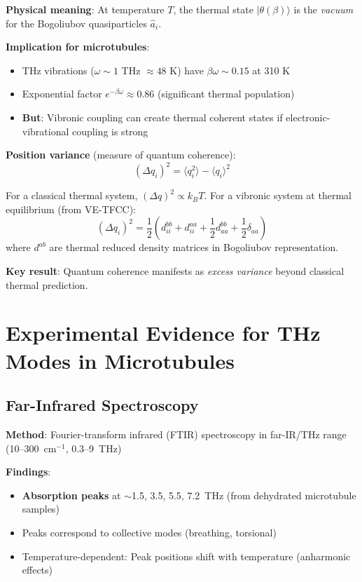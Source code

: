 \textbf{Physical meaning}: At temperature $T$, the thermal state
$|\theta(\beta)\rangle$ is the \emph{vacuum} for the Bogoliubov
quasiparticles $\hat{a}_i$.

\textbf{Implication for microtubules}:
\begin{itemize}
\item THz vibrations ($\omega \sim 1$ THz $\approx 48$ K) have $\beta \omega \sim 0.15$ at 310 K
\item Exponential factor $e^{-\beta \omega} \approx 0.86$ (significant thermal population)
\item \textbf{But}: Vibronic coupling can create thermal coherent states if electronic-vibrational coupling is strong
\end{itemize}

\textbf{Position variance} (measure of quantum coherence):
\begin{equation}
\label{eq:position-variance}
(\Delta q_i)^2 = \langle q_i^2 \rangle - \langle q_i \rangle^2
\end{equation}

For a classical thermal system, $(\Delta q)^2 \propto k_B T$. For a vibronic system at thermal equilibrium (from VE-TFCC):
\[(\Delta q_i)^2 = \frac{1}{2} \left( d_{ii}^{bb} + d_{ii}^{aa} + \frac{1}{2} d_{aa}^{bb} + \frac{1}{2} \delta_{aa} \right)\]
where $d^{ab}$ are thermal reduced density matrices in Bogoliubov representation.

\textbf{Key result}: Quantum coherence manifests as \emph{excess variance} beyond classical thermal prediction.



\section{Experimental Evidence for THz Modes in Microtubules}\label{experimental-evidence-for-thz-modes-in-microtubules}

\subsection{Far-Infrared Spectroscopy}\label{far-infrared-spectroscopy-established}

\textbf{Method}: Fourier-transform infrared (FTIR) spectroscopy in far-IR/THz range (10--300~cm$^{-1}$, 0.3--9~THz)

\textbf{Findings}:
\begin{itemize}
\item \textbf{Absorption peaks} at $\sim$1.5, 3.5, 5.5, 7.2~THz (from dehydrated microtubule samples)
\item Peaks correspond to collective modes (breathing, torsional)
\item Temperature-dependent: Peak positions shift with temperature (anharmonic effects)
\end{itemize}

